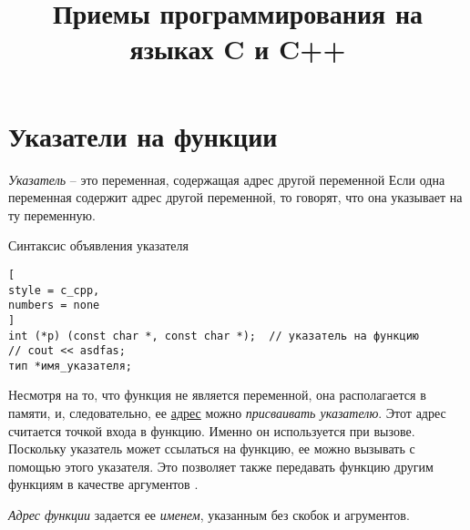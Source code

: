 \documentclass[%
	11pt,
	a4paper,
	utf8,
		]{article}
\begin{document}
\title{Приемы программирования на языках C и C++}

\author{}

\date{}
\maketitle

\thispagestyle{fancy}

\tableofcontents

\section{Указатели на функции}

\emph{Указатель} -- это переменная, содержащая адрес другой переменной  Если одна переменная содержит адрес другой переменной, то говорят, что она указывает на ту переменную\cite[]{koltzov-c-lang:2019}.

Синтаксис объявления указателя
\begin{lstlisting}[
style = c_cpp,
numbers = none
]
int (*p) (const char *, const char *);  // указатель на функцию
// cout << asdfas;
тип *имя_указателя;
\end{lstlisting}

Несмотря на то, что функция не является переменной, она располагается в памяти, и, следовательно, ее \underline{адрес} можно \emph{присваивать указателю}. Этот адрес считается точкой входа в функцию. Именно он используется при вызове. Поскольку указатель может ссылаться на функцию, ее можно вызывать с помощью этого указателя. Это позволяет также передавать функцию другим функциям в качестве аргументов \cite{koltzov-c-lang:2019}.

\emph{Адрес функции} задается ее \emph{именем}, указанным без скобок и агрументов.



\begin{thebibliography}{99}
\end{thebibliography}


\lstlistoflistings{}
\end{document}
